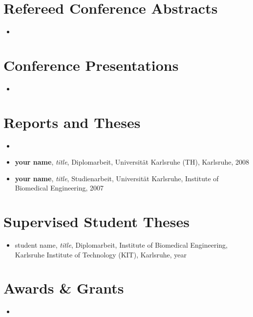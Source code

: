 \section*{Refereed Conference Abstracts}
\label{sec:PublicationsPresentations}

\begin{itemize}
	\item 
\end{itemize}


\section*{Conference Presentations}

\begin{itemize}
	\item 
\end{itemize}


\section*{Reports and Theses}
\label{sec:PublicationsReports}

\begin{itemize}
	\item 
	\item \textbf{your name}, \textit{title}, Diplomarbeit, Universit\"at Karlsruhe (TH), Karlsruhe, 2008
	\item \textbf{your name}, \textit{title}, Studienarbeit, Universit\"at Karlsruhe, Institute of Biomedical Engineering, 2007
\end{itemize}


\section*{Supervised Student Theses}
\label{sec:PublicationsSupervisor}

\begin{itemize}
	\item student name, \textit{title}, Diplomarbeit, Institute of Biomedical Engineering, Karlsruhe Institute of Technology (KIT), Karlsruhe, year
\end{itemize}


\section*{Awards \& Grants}
\label{sec:CVawardsGrants}

\begin{itemize}
	\item 
\end{itemize}
